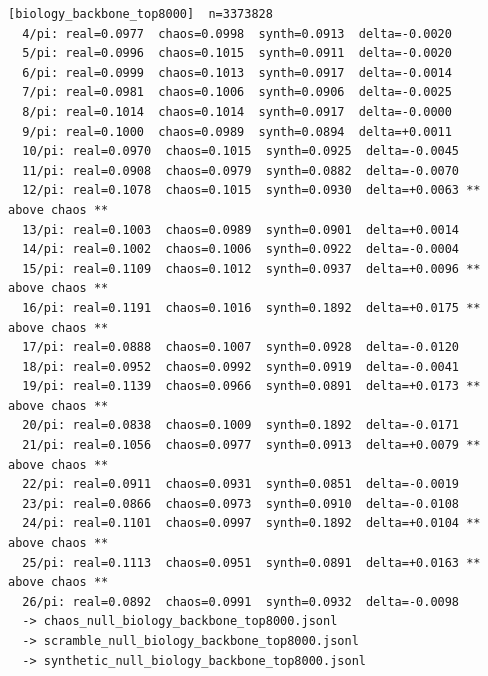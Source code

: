 \documentclass[11pt, letterpaper, openany]{book}
\begin{document}
\begin{empiricalbox}
\begin{lstlisting}[style=terminal]
[biology_backbone_top8000]  n=3373828
  4/pi: real=0.0977  chaos=0.0998  synth=0.0913  delta=-0.0020
  5/pi: real=0.0996  chaos=0.1015  synth=0.0911  delta=-0.0020
  6/pi: real=0.0999  chaos=0.1013  synth=0.0917  delta=-0.0014
  7/pi: real=0.0981  chaos=0.1006  synth=0.0906  delta=-0.0025
  8/pi: real=0.1014  chaos=0.1014  synth=0.0917  delta=-0.0000
  9/pi: real=0.1000  chaos=0.0989  synth=0.0894  delta=+0.0011
  10/pi: real=0.0970  chaos=0.1015  synth=0.0925  delta=-0.0045
  11/pi: real=0.0908  chaos=0.0979  synth=0.0882  delta=-0.0070
  12/pi: real=0.1078  chaos=0.1015  synth=0.0930  delta=+0.0063 ** above chaos **
  13/pi: real=0.1003  chaos=0.0989  synth=0.0901  delta=+0.0014
  14/pi: real=0.1002  chaos=0.1006  synth=0.0922  delta=-0.0004
  15/pi: real=0.1109  chaos=0.1012  synth=0.0937  delta=+0.0096 ** above chaos **
  16/pi: real=0.1191  chaos=0.1016  synth=0.1892  delta=+0.0175 ** above chaos **
  17/pi: real=0.0888  chaos=0.1007  synth=0.0928  delta=-0.0120
  18/pi: real=0.0952  chaos=0.0992  synth=0.0919  delta=-0.0041
  19/pi: real=0.1139  chaos=0.0966  synth=0.0891  delta=+0.0173 ** above chaos **
  20/pi: real=0.0838  chaos=0.1009  synth=0.1892  delta=-0.0171
  21/pi: real=0.1056  chaos=0.0977  synth=0.0913  delta=+0.0079 ** above chaos **
  22/pi: real=0.0911  chaos=0.0931  synth=0.0851  delta=-0.0019
  23/pi: real=0.0866  chaos=0.0973  synth=0.0910  delta=-0.0108
  24/pi: real=0.1101  chaos=0.0997  synth=0.1892  delta=+0.0104 ** above chaos **
  25/pi: real=0.1113  chaos=0.0951  synth=0.0891  delta=+0.0163 ** above chaos **
  26/pi: real=0.0892  chaos=0.0991  synth=0.0932  delta=-0.0098
  -> chaos_null_biology_backbone_top8000.jsonl
  -> scramble_null_biology_backbone_top8000.jsonl
  -> synthetic_null_biology_backbone_top8000.jsonl


\end{lstlisting}
\end{empiricalbox}
\end{document}
